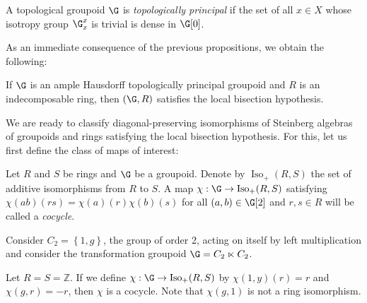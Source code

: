 \begin{definition}\label{definitiontopologicallyprincipal}
A topological groupoid $\G$ is \emph{topologically principal} if the set of all $x\in X$ whose isotropy group $\G_x^x$ is trivial is dense in $\G[0]$.
\end{definition}

As an immediate consequence of the previous propositions, we obtain the following:

\begin{corollary}\label{corollarytopologicallyprincipalsatisfieslocalbisectionhypothesis}
If $\G$ is an ample Hausdorff topologically principal groupoid and $R$ is an indecomposable ring, then $(\G,R)$ satisfies the local bisection hypothesis.
\end{corollary}

We are ready to classify diagonal-preserving isomorphisms of Steinberg algebras of groupoids and rings satisfying the local bisection hypothesis. For this, let us first define the class of maps of interest:

\begin{definition}\label{definitioncocycle}
Let $R$ and $S$ be rings and $\G$ be a groupoid. Denote by $\operatorname{Iso}_+(R,S)$ the set of additive isomorphisms from $R$ to $S$. A map $\chi:\G\to\operatorname{Iso}_+(R,S)$ satisfying $\chi(ab)(rs)=\chi(a)(r)\chi(b)(s)$ for all $(a,b)\in\G[2]$ and $r,s\in R$ will be called a \emph{cocycle}.
\end{definition}


\begin{example}
Consider $C_2=\left\{1,g\right\}$, the group of order 2, acting on itself by left multiplication and consider the transformation groupoid $\G=C_2\ltimes C_2$.

Let $R=S=\mathbb{Z}$. If we define $\chi:\G\to\operatorname{Iso}_+(R,S)$ by $\chi(1,y)(r)=r$ and $\chi(g,r)=-r$, then $\chi$ is a cocycle. Note that $\chi(g,1)$ is not a ring isomorphism.
\end{example}


